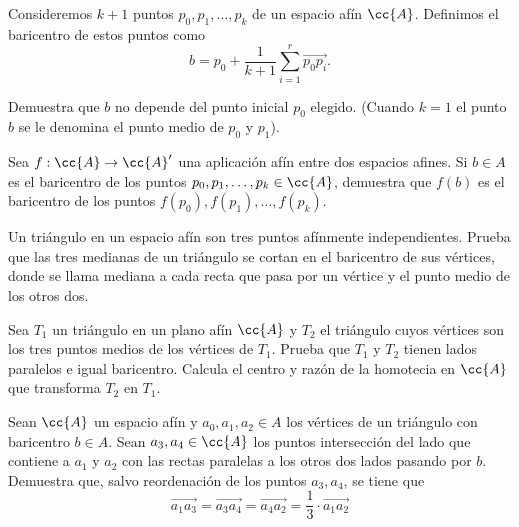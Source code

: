\begin{ejercicio}
    Consideremos $k + 1$ puntos $p_0, p_1, \dots , p_k$ de un espacio afín $\cc{A}$. Definimos el baricentro de estos puntos como
    \begin{equation*}
        b=p_0+\frac{1}{k+1} \sum_{i=1}^r \vec{p_0p_i}.
    \end{equation*}

    Demuestra que $b$ no depende del punto inicial $p_0$ elegido. (Cuando $k = 1$ el punto $b$ se le denomina el punto medio de $p_0$ y $p_1$).
\end{ejercicio}

\begin{ejercicio}
    Sea $f : \cc{A} \to \cc{A}'$ una aplicación afín entre dos espacios afines. Si $b \in A$ es el baricentro de los puntos $p_0, p_1, \dots , p_k \in \cc{A}$, demuestra que $f (b)$ es el baricentro de los puntos $f (p_0), f (p_1), \dots , f (p_k)$.
\end{ejercicio}

\begin{ejercicio}
    Un triángulo en un espacio afín son tres puntos afínmente independientes. Prueba que las tres medianas de un triángulo se cortan en el baricentro de sus vértices, donde se llama mediana a cada recta que pasa por un vértice y el punto medio de los otros dos.
\end{ejercicio}

\begin{ejercicio}
    Sea $T_1$ un triángulo en un plano afín $\cc{A}$ y $T_2$ el triángulo cuyos vértices son los tres puntos medios de los vértices de $T_1$. Prueba que $T_1$ y $T_2$ tienen lados paralelos e igual baricentro. Calcula el centro y razón de la homotecia en $\cc{A}$ que transforma $T_2$ en $T_1$.
\end{ejercicio}

\begin{ejercicio}
    Sean $\cc{A}$ un espacio afín y $a_0, a_1, a_2 \in A$ los vértices de un triángulo con baricentro $b \in A$. Sean $a_3, a_4 \in \cc{A}$ los puntos intersección del lado que contiene a $a_1$ y $a_2$ con las rectas paralelas a los otros dos lados pasando por $b$. Demuestra que, salvo reordenación de los puntos $a_3, a_4$, se tiene que
    \begin{equation*}
        \vec{a_1a_3} = \vec{a_3a_4}= \vec{a_4a_2} = \frac{1}{3} \cdot \vec{a_1a_2}
    \end{equation*}
\end{ejercicio}

